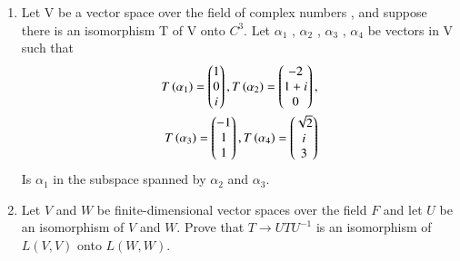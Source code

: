 \renewcommand{\theequation}{\theenumi}
\renewcommand{\thefigure}{\theenumi}
\begin{enumerate}[label=\thesubsection.\arabic*.,ref=\thesubsection.\theenumi]
%
\item Let V be a vector space over the field of complex numbers , and suppose there is an isomorphism T of V onto $C^{3}$. Let $\alpha_1$ , $\alpha_2$ , $\alpha_3$  , $\alpha_4$ be vectors in V such that 
   \begin{multline}
    \begin{aligned}
    T\left(\alpha_1\right)=\begin{pmatrix}1\\0\\i\end{pmatrix} , T\left(\alpha_2\right)=\begin{pmatrix}-2\\1+i\\0\end{pmatrix} ,\\ T\left(\alpha_3\right)=\begin{pmatrix}-1\\1\\1\end{pmatrix} , T\left(\alpha_4\right)=\begin{pmatrix}\sqrt{2}\\i\\3\end{pmatrix}
    \end{aligned}
    \end{multline}
    Is $\alpha_1$ in the subspace spanned by $\alpha_2$ and $\alpha_3$.
%
\solution

\item Let $V$ and $W$ be finite-dimensional vector spaces over the field $F$ and let $U$ be an isomorphism of $V$ and $W$. Prove that $T \rightarrow UTU^{-1}$ is an isomorphism of $L(V,V)$ onto $L(W,W)$.
%
\solution

%
\end{enumerate}
